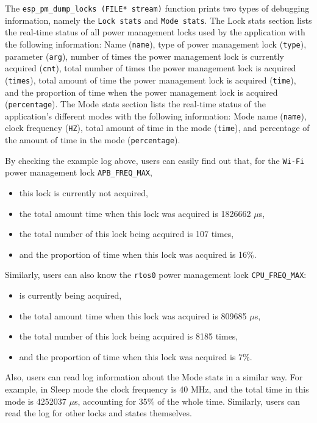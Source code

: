 \documentclass[a4paper,12pt]{book}
\begin{document}
The \verb|esp_pm_dump_locks (FILE* stream)| function prints two types of debugging information, namely the \verb|Lock stats| and \verb|Mode stats|. The Lock stats section lists the real-time status of all power management locks used by the application with the following information: Name (\verb|name|), type of power management lock (\verb|type|), parameter (\verb|arg|), number of times the power management lock is currently acquired (\verb|cnt|), total number of times the power management lock is acquired (\verb|times|), total amount of time the power management lock is acquired (\verb|time|), and the proportion of time when the power management lock is acquired (\verb|percentage|). The Mode stats section lists the real-time status of the application’s different modes with the following information: Mode name (\verb|name|), clock frequency (\verb|HZ|), total amount of time in the mode (\verb|time|), and percentage of the amount of time in the mode (\verb|percentage|).

By checking the example log above, users can easily find out that, for the \verb|Wi-Fi| power management lock \verb|APB_FREQ_MAX|, 

\begin{itemize}
    \parskip 0pt
    \item this lock is currently not acquired,
    \item the total amount time when this lock was acquired is 1826662 $\mu$s,
    \item the total number of this lock being acquired is 107 times,
    \item and the proportion of time when this lock was acquired is 16\%. 
\end{itemize}

Similarly, users can also know the \verb|rtos0| power management lock \verb|CPU_FREQ_MAX|:

\begin{itemize}
    \parskip 0pt
    \item is currently being acquired,
    \item the total amount time when this lock was acquired is 809685 $\mu$s,
    \item the total number of this lock being acquired is 8185 times,
    \item and the proportion of time when this lock was acquired is 7\%.
\end{itemize}

Also, users can read log information about the Mode stats in a similar way. For example, in Sleep mode the clock frequency is 40 MHz, and the total time in this mode is 4252037 $\mu$s, accounting for 35\% of the whole time. Similarly, users can read the log for other locks and states themselves.
\end{document}
